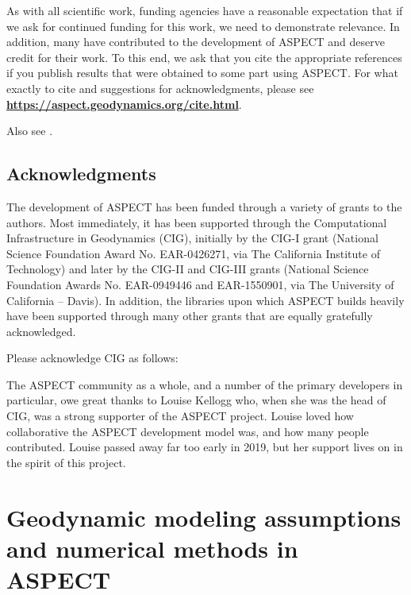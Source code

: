 \documentclass{article}
\newcommand{\aspect}{\textsc{ASPECT}}
\begin{document}
As with all scientific work, funding agencies have a reasonable expectation
that if we ask for continued funding for this work, we need to demonstrate
relevance.
In addition, many have contributed to the development of \aspect{} and deserve credit
for their work.
To this end, we ask that you cite the appropriate references if you
publish results that were obtained to some part using \aspect{}. For
what exactly to cite and suggestions for acknowledgments,
please see
{\bf \url{https://aspect.geodynamics.org/cite.html}}.

Also see \cite{aspect-doi-v1.5.0,aspect-doi-v2.0.0,aspect-doi-v2.0.1,aspectmanual,KHB12,heister_aspect_methods2}.


\subsection{Acknowledgments}

The development of \aspect{} has been funded
through a variety of grants to the authors. Most immediately, it has been
supported through the Computational Infrastructure in Geodynamics
(CIG), initially by the CIG-I grant (National Science Foundation Award No. EAR-0426271,
via The California Institute of Technology) and later by the CIG-II
and CIG-III grants
(National Science Foundation Awards No. EAR-0949446 and EAR-1550901, via The University
of California -- Davis). In addition, the libraries upon
which \aspect{} builds heavily have been supported through many other grants
that are equally gratefully acknowledged.

Please acknowledge CIG as follows:
{\parindent0pt
  \begin{center}
  \end{center}
}

The \aspect{} community as a whole, and a number of the primary
developers in particular, owe great thanks to Louise Kellogg
who, when she was the head of CIG, was a strong supporter of the
\aspect{} project. Louise loved how collaborative the \aspect{}
development model was, and how many people contributed. Louise passed
away far too early in 2019, but her support lives on in the spirit of
this project.


\section{Geodynamic modeling assumptions and numerical methods in \aspect{}}
\label{sec:models}
\end{document}
